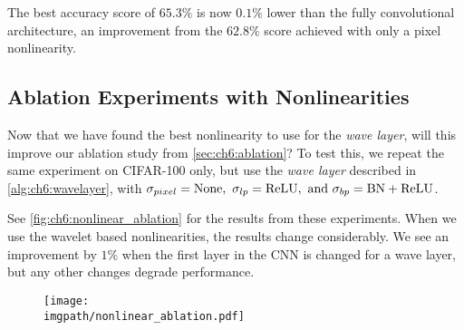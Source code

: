 The best accuracy score of $65.3\%$ is now $0.1\%$ lower than the fully
convolutional architecture, an improvement from the $62.8\%$ score achieved with
only a pixel nonlinearity.

\subsection{Ablation Experiments with Nonlinearities}
Now that we have found the best nonlinearity to use for the \emph{wave layer},
will this improve our ablation study from \autoref{sec:ch6:ablation}? To test this, 
we repeat the
same experiment on CIFAR-100 only, but use the \emph{wave layer} described in
\autoref{alg:ch6:wavelayer}, with $\sigma_{pixel} = \mathrm{None},\ \sigma_{lp} =
\mathrm{ReLU},\ \text{and } \sigma_{bp} = \mathrm{BN+ReLU}$.

See \autoref{fig:ch6:nonlinear_ablation} for the results from these experiments.
When we use the wavelet based nonlinearities, the results change considerably. 
We see an improvement by $1\%$ when the first layer in the CNN is
changed for a wave layer, but any other changes degrade performance.

\begin{figure}[tb]
  \centering
  \texttt{[image: \\imgpath/nonlinear\_ablation.pdf]}
  \label{fig:ch6:nonlinear_ablation}
\end{figure}

